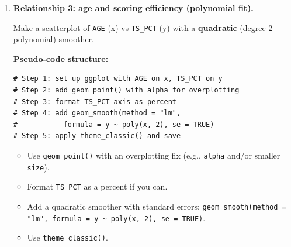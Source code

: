 \documentclass[11pt]{article}
\begin{document}
\begin{enumerate}
  Make a scatterplot of \texttt{PLAYER\_WEIGHT} (x) vs \texttt{REB} (y).

  \textbf{Pseudo-code structure:}
\begin{verbatim}
# Step 1: set up ggplot with PLAYER_WEIGHT on x, REB on y
# Step 2: add geom_point() with alpha for overplotting
# Step 3: add geom_smooth(method = "lm", se = TRUE)
# Step 4: apply theme_classic() and labels
# Step 5: save with ggsave()
\end{verbatim}

  \begin{itemize}
    \item Use \texttt{geom\_point()} with an overplotting fix (e.g., \texttt{alpha} and/or smaller \texttt{size}).
    \item Add a linear smoother with standard errors: \texttt{geom\_smooth(method = "lm", se = TRUE)}.
    \item Use \texttt{theme\_classic()}.
  \end{itemize}

  \noindent \textbf{Write-up (3--5 sentences):}
  \begin{itemize}
    \item What direction and strength does the relationship show?
    \item Give one plausible basketball reason heavier players might (or might not) average more rebounds.
  \end{itemize}

  \noindent Save as:
  \[
    \texttt{figures/size\_reb\_scatter.png}
  \]

  \item \textbf{Relationship 3: age and scoring efficiency (polynomial fit).}

  Make a scatterplot of \texttt{AGE} (x) vs \texttt{TS\_PCT} (y) with a \textbf{quadratic} (degree-2 polynomial) smoother.

  \textbf{Pseudo-code structure:}
\begin{verbatim}
# Step 1: set up ggplot with AGE on x, TS_PCT on y
# Step 2: add geom_point() with alpha for overplotting
# Step 3: format TS_PCT axis as percent
# Step 4: add geom_smooth(method = "lm",
#           formula = y ~ poly(x, 2), se = TRUE)
# Step 5: apply theme_classic() and save
\end{verbatim}

  \begin{itemize}
    \item Use \texttt{geom\_point()} with an overplotting fix (e.g., \texttt{alpha} and/or smaller \texttt{size}).
    \item Format \texttt{TS\_PCT} as a percent if you can.
    \item Add a quadratic smoother with standard errors: \texttt{geom\_smooth(method = "lm", formula = y \textasciitilde{} poly(x, 2), se = TRUE)}.
    \item Use \texttt{theme\_classic()}.
  \end{itemize}


\end{enumerate}
\end{document}
